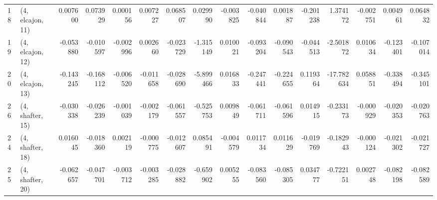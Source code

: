 \begin{tabular}{llrrrrrrrrrrrrrr}
18 &  (4, elcajon, 11) &  0.007600 &  0.073929 &   0.000156 &  0.007227 &  0.068507 &   0.029990 & -0.003825 &  -0.040844 &  0.001887 & -0.201238 &   1.374172 & -0.002751 &  0.004961 &  0.064832 \\
19 &  (4, elcajon, 12) & -0.053880 & -0.010597 &  -0.002996 &  0.002660 & -0.023729 &  -1.315149 &  0.010021 &  -0.093204 & -0.090543 & -0.044513 &  -2.501872 &  0.010634 & -0.123401 & -0.107014 \\
20 &  (4, elcajon, 13) & -0.143245 & -0.168112 &  -0.006520 & -0.011658 & -0.028690 &  -5.899466 &  0.016833 &  -0.247441 & -0.224655 &  0.119364 & -17.782634 &  0.058851 & -0.338494 & -0.345101 \\
26 &  (4, shafter, 15) & -0.030338 & -0.026239 &  -0.001039 & -0.002179 & -0.061557 &  -0.525753 &  0.009849 &  -0.061711 & -0.061596 &  0.014915 &  -0.233173 & -0.000929 & -0.020353 & -0.020763 \\
24 &  (4, shafter, 18) &  0.016045 & -0.018360 &   0.002119 & -0.000775 & -0.012607 &   0.085491 & -0.004579 &   0.011734 &  0.011629 & -0.019769 &  -0.182943 & -0.000124 & -0.021302 & -0.021727 \\
25 &  (4, shafter, 20) & -0.062657 & -0.047701 &  -0.003712 & -0.003285 & -0.028882 &  -0.659902 &  0.005255 &  -0.083560 & -0.085305 &  0.034777 &  -0.722151 &  0.002748 & -0.082198 & -0.082589 \\
\bottomrule
\end{tabular}
